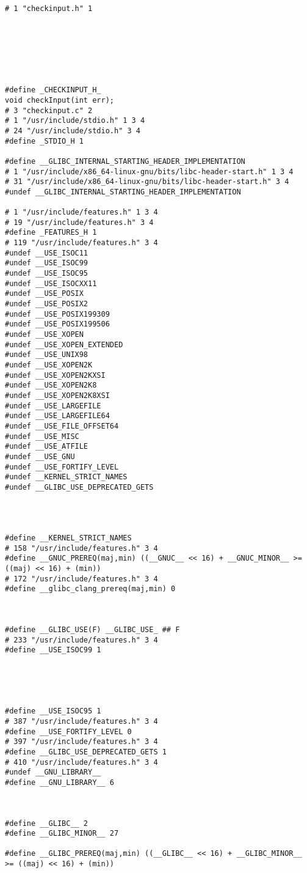 \documentclass[11pt]{article}
\begin{document}
\begin{verbatim}
# 1 "checkinput.h" 1







#define _CHECKINPUT_H_ 
void checkInput(int err);
# 3 "checkinput.c" 2
# 1 "/usr/include/stdio.h" 1 3 4
# 24 "/usr/include/stdio.h" 3 4
#define _STDIO_H 1

#define __GLIBC_INTERNAL_STARTING_HEADER_IMPLEMENTATION 
# 1 "/usr/include/x86_64-linux-gnu/bits/libc-header-start.h" 1 3 4
# 31 "/usr/include/x86_64-linux-gnu/bits/libc-header-start.h" 3 4
#undef __GLIBC_INTERNAL_STARTING_HEADER_IMPLEMENTATION

# 1 "/usr/include/features.h" 1 3 4
# 19 "/usr/include/features.h" 3 4
#define _FEATURES_H 1
# 119 "/usr/include/features.h" 3 4
#undef __USE_ISOC11
#undef __USE_ISOC99
#undef __USE_ISOC95
#undef __USE_ISOCXX11
#undef __USE_POSIX
#undef __USE_POSIX2
#undef __USE_POSIX199309
#undef __USE_POSIX199506
#undef __USE_XOPEN
#undef __USE_XOPEN_EXTENDED
#undef __USE_UNIX98
#undef __USE_XOPEN2K
#undef __USE_XOPEN2KXSI
#undef __USE_XOPEN2K8
#undef __USE_XOPEN2K8XSI
#undef __USE_LARGEFILE
#undef __USE_LARGEFILE64
#undef __USE_FILE_OFFSET64
#undef __USE_MISC
#undef __USE_ATFILE
#undef __USE_GNU
#undef __USE_FORTIFY_LEVEL
#undef __KERNEL_STRICT_NAMES
#undef __GLIBC_USE_DEPRECATED_GETS




#define __KERNEL_STRICT_NAMES 
# 158 "/usr/include/features.h" 3 4
#define __GNUC_PREREQ(maj,min) ((__GNUC__ << 16) + __GNUC_MINOR__ >= ((maj) << 16) + (min))
# 172 "/usr/include/features.h" 3 4
#define __glibc_clang_prereq(maj,min) 0



#define __GLIBC_USE(F) __GLIBC_USE_ ## F
# 233 "/usr/include/features.h" 3 4
#define __USE_ISOC99 1





#define __USE_ISOC95 1
# 387 "/usr/include/features.h" 3 4
#define __USE_FORTIFY_LEVEL 0
# 397 "/usr/include/features.h" 3 4
#define __GLIBC_USE_DEPRECATED_GETS 1
# 410 "/usr/include/features.h" 3 4
#undef __GNU_LIBRARY__
#define __GNU_LIBRARY__ 6



#define __GLIBC__ 2
#define __GLIBC_MINOR__ 27

#define __GLIBC_PREREQ(maj,min) ((__GLIBC__ << 16) + __GLIBC_MINOR__ >= ((maj) << 16) + (min))






\end{verbatim}
\end{document}
